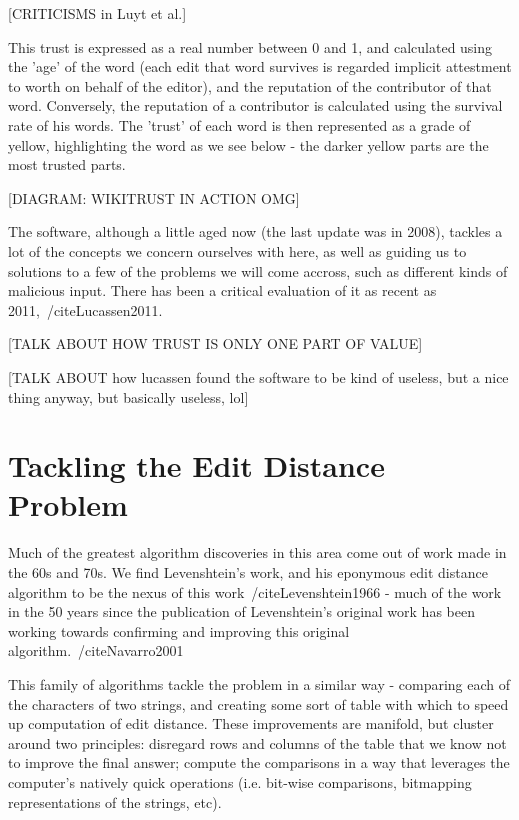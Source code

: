 \documentclass[a4paper,11pt,twoside,notitlepage]{report}
\begin{document}
        [CRITICISMS in Luyt et al.]

        This trust is expressed as a real number between 0 and 1, and
        calculated using the 'age' of the word (each edit that word
        survives is regarded implicit attestment to worth on behalf of
        the editor), and the reputation of the contributor of that
        word. Conversely, the reputation of a contributor is
        calculated using the survival rate of his words. The 'trust'
        of each word is then represented as a grade of yellow,
        highlighting the word as we see below - the darker yellow
        parts are the most trusted parts.

        [DIAGRAM: WIKITRUST IN ACTION OMG]

        The software, although a little aged now (the last update was
        in 2008), tackles a lot of the concepts we concern ourselves
        with here, as well as guiding us to solutions to a few of the
        problems we will come accross, such as different kinds of
        malicious input. There has been a critical evaluation of it as
        recent as 2011,~/cite{Lucassen2011}. 

        [TALK ABOUT HOW TRUST IS ONLY ONE PART OF VALUE]

        [TALK ABOUT how lucassen found the software to be kind of
          useless, but a nice thing anyway, but basically useless, lol]
 
	\section{Tackling the Edit Distance Problem}
        Much of the greatest algorithm discoveries in this area come
        out of work made in the 60s and 70s. We find Levenshtein's
        work, and his eponymous edit distance algorithm to be the nexus of
        this work~/cite{Levenshtein1966} - much of the work in the 50 years since the
        publication of Levenshtein's original work has been working
        towards confirming and improving this original algorithm.~/cite{Navarro2001}

        This family of algorithms tackle the problem in a similar way
        - comparing each of the characters of two strings, and
        creating some sort of table with which to speed up computation
        of edit distance. These improvements are manifold, but
        cluster around two principles: disregard rows and columns of
        the table that we know not to improve the final answer;
        compute the comparisons in a way that leverages the computer's
        natively quick operations (i.e. bit-wise comparisons,
        bitmapping representations of the strings, etc).
\end{document}

